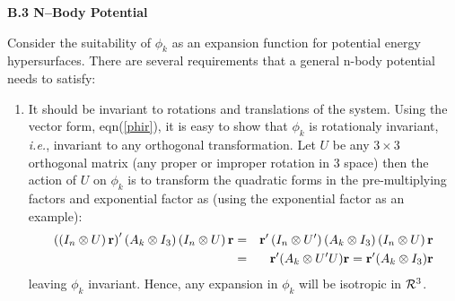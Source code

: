 \vspace{2mm}
\noindent
{\bf B.3 N--Body Potential}

Consider the suitability of $\phi_k$ as an expansion function for potential
energy hypersurfaces. There are several requirements that a general n-body
potential needs to satisfy:

\begin{enumerate}


\item  It should be invariant to rotations 
and translations of the system.
Using the vector form, eqn(\ref{phir}), it is easy to show that $\phi _k$ is
rotationaly invariant, {\it i.e.}, 
invariant to any orthogonal transformation.
Let $U$ be any $3\times 3$ orthogonal matrix (any proper or improper
rotation in 3 space) then the action of $U$ on $\phi _k$ is to transform the
quadratic forms in the pre-multiplying factors and exponential factor as
(using the exponential factor as an example): 
\begin{eqnarray}
\left( \left( I_n\otimes U\right) {\bf r}\right) ^{\prime }(A_k\otimes
I_3)\left( I_n\otimes U\right) {\bf r} &=&{\bf r}^{\prime }\left(
I_n\otimes U^{\prime }\right) (A_k\otimes I_3)\left( I_n\otimes U\right) 
{\bf r} \\
&=&{\bf r}^{\prime }(A_k\otimes U^{\prime }U){\bf r} 
= {\bf r}^{\prime }(A_k\otimes I_3){\bf r}
\end{eqnarray}
leaving $\phi _k$ invariant. Hence, any expansion in $\phi _k$ will be
isotropic in ${\cal R}^3$.





\end{enumerate}
